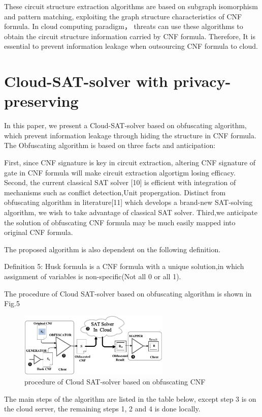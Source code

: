 \documentclass[runningheads,a4paper]{llncs}
\begin{document}
These circuit structure extraction algorithms are based on subgraph isomorphism and pattern matching, 
exploiting the graph structure characteristics of CNF formula. In cloud computing paradigm，
threats can use these algorithms to obtain the circuit structure information carried by CNF formula.
Therefore, It is essential to prevent information leakage when outsourcing CNF formula to cloud.

\section{Cloud-SAT-solver with privacy-preserving}

In this paper, we present a Cloud-SAT-solver based on obfuscating algorithm, which prevent information leakage through hiding the structure in CNF formula.
The Obfuscating algorithm is based on three facts and anticipation:

First, since CNF signature is key in circuit extraction, altering CNF signature of gate in CNF formula will make circuit extraction algortigm losing efficacy.
Second, the current classical SAT solver [10] is efficient with integration of mechanisms such as conflict detection,Unit propergation.
Distinct from obfuscating algorithm in literature[11] which develops a brand-new SAT-solving algorithm, we wish to take advantage of classical SAT solver.
Third,we anticipate the solution of obfuscating CNF formula may be much easily mapped into original CNF formula.

The proposed algorithm is also dependent on the following definition.

\noindent Definition 5: Husk formula is a CNF formula with a unique solution,in which assignment of variables is non-specific(Not all 0 or all 1).

The procedure of Cloud SAT-solver based on obfuscating algorithm is shown in Fig.5
\begin{figure}
\centering
\includegraphics[width=7.2cm]{a5}
\caption{procedure of Cloud SAT-solver based on obfuscating CNF}
\end{figure}

The main steps of the algorithm are listed in the table below, except step 3 is on the cloud server, the remaining steps 1, 2 and 4 is done locally.
\end{document}
